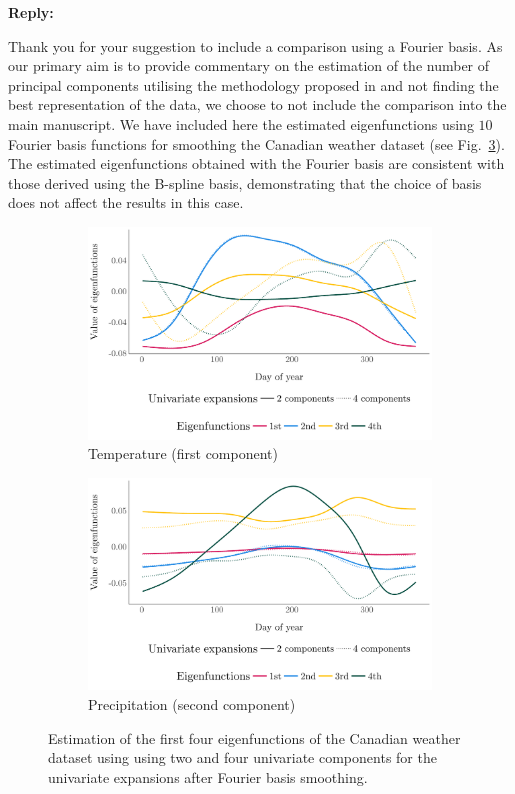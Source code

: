 \documentclass[12pt,a4paper]{article}
\newcommand{\reply}[1]{
    \noindent\textbf{Reply:}

\begin{mdframed}[style=replies] 
    #1
\end{mdframed}
}
\begin{document}
\reply{Thank you for your suggestion to include a comparison using a Fourier basis. As our primary aim is to provide commentary on the estimation of the number of principal components utilising the methodology proposed in \cite{happMultivariateFunctionalPrincipal2018} and not finding the best representation of the data, we choose to not include the comparison into the main manuscript. We have included here the estimated eigenfunctions using $10$ Fourier basis functions for smoothing the Canadian weather dataset (see Fig.~\ref{fig:eigenfunctions_weather}). The estimated eigenfunctions obtained with the Fourier basis are consistent with those derived using the B-spline basis, demonstrating that the choice of basis does not affect the results in this case.}
\begin{figure}[!h]
     \centering
     \begin{subfigure}[b]{0.49\textwidth}
         \centering
         \includegraphics[width=1\textwidth]{temperature_eigen_fourier.pdf}
         \caption{Temperature (first component)}
         \label{fig:temperature}
     \end{subfigure}
     \hfill
     \begin{subfigure}[b]{0.49\textwidth}
         \centering
         \includegraphics[width=1\textwidth]{precipitation_eigen_fourier.pdf}
         \caption{Precipitation (second component)}
         \label{fig:precipitation}
     \end{subfigure}
     \caption{Estimation of the first four eigenfunctions of the Canadian weather dataset using using two and four univariate components for the univariate expansions after Fourier basis smoothing.}
     \label{fig:eigenfunctions_weather}
\end{figure}
\end{document}
